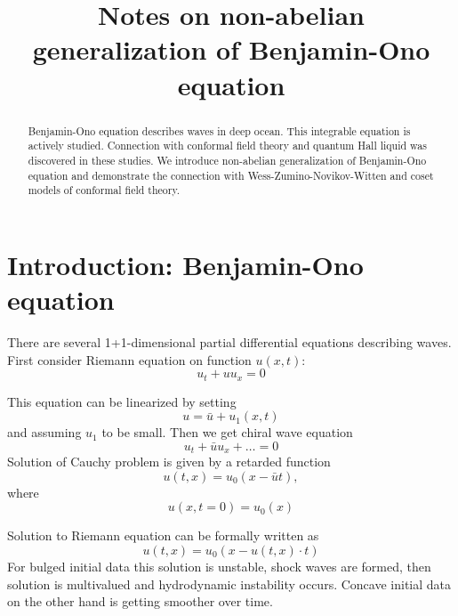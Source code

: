 \documentclass[12pt]{article}
\begin{document}
\title{Notes on non-abelian generalization of Benjamin-Ono equation}

\maketitle

\begin{abstract}
Benjamin-Ono equation describes waves in deep ocean. This integrable equation is actively studied.
Connection with conformal field theory and quantum Hall liquid was discovered in these studies. 
We introduce non-abelian generalization of Benjamin-Ono equation and demonstrate the connection with
Wess-Zumino-Novikov-Witten and coset models of conformal field theory.
\end{abstract}

\section{Introduction: Benjamin-Ono equation}
\label{sec:introduction}

There are several 1+1-dimensional partial differential equations describing waves. First consider
Riemann equation on function $u(x,t)$:
\begin{equation}
  \label{eq:1}
  u_{t}+ u u_{x} =0
\end{equation}

This equation can be linearized by setting
\begin{equation}
  \label{eq:2}
  u=\bar u+u_{1} (x,t)
\end{equation}
and assuming $u_{1}$ to be small. Then we get chiral wave equation
\begin{equation}
  \label{eq:3}
  u_{t}+\bar u u_{x}+\dots=0
\end{equation}
Solution of Cauchy problem is given by a retarded function
\begin{equation}
  \label{eq:4}
  u(t,x)=u_{0}(x-\bar u t),
\end{equation}
where
\begin{equation}
  \label{eq:5}
  u(x,t=0)=u_{0}(x)
\end{equation}

Solution to Riemann equation can be formally written as
\begin{equation}
  \label{eq:6}
  u(t,x)=u_{0}(x-u(t,x)\cdot t)
\end{equation}
For bulged initial data this solution is unstable, shock waves are formed, then solution is multivalued and hydrodynamic
instability occurs. Concave initial data on the other hand is getting smoother over time. 
\end{document}
